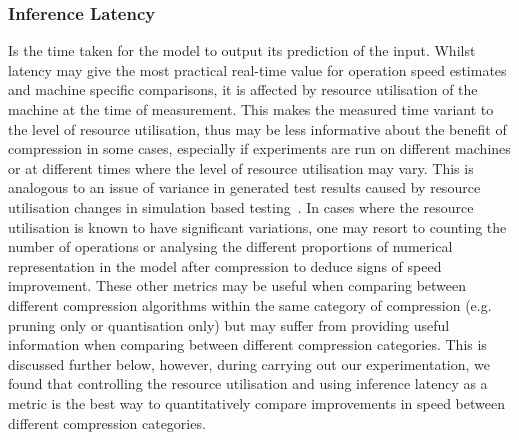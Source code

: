 \subsubsection{Inference Latency}
Is the time taken for the model to output its prediction of the input. 
%
Whilst latency may give the most practical real-time value for operation speed estimates and machine specific comparisons, it is affected by resource utilisation of the machine at the time of measurement. 
%
This makes the measured time variant to the level of resource utilisation, thus may be less informative about the benefit of compression in some cases, especially if experiments are run on different machines or at different times where the level of resource utilisation may vary. 
%
This is analogous to an issue of variance in generated test results caused by resource utilisation changes in simulation based testing~\cite{determinisim}.
%
In cases where the resource utilisation is known to have significant variations, one may resort to counting the number of operations or analysing the different proportions of numerical representation in the model after compression to deduce signs of speed improvement.%
%
These other metrics may be useful when comparing between different compression algorithms within the same category of compression (e.g. pruning only or quantisation only) but may suffer from providing useful information when comparing between different compression categories. 
%
This is discussed further below, however, during carrying out our experimentation, we found that controlling the resource utilisation and using inference latency as a metric is the best way to quantitatively compare improvements in speed between different compression categories.






